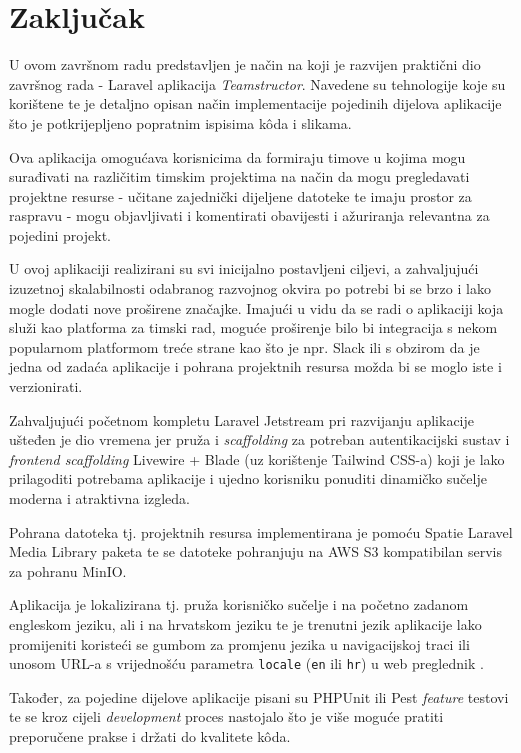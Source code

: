 \section{Zaključak}
U ovom završnom radu predstavljen je način na koji je razvijen praktični dio završnog rada - Laravel aplikacija \textit{Teamstructor}. Navedene su tehnologije koje su korištene te je detaljno opisan način implementacije pojedinih dijelova aplikacije što je potkrijepljeno popratnim ispisima k\^oda i slikama.

Ova aplikacija omogućava korisnicima da formiraju timove u kojima mogu surađivati na različitim timskim projektima na način da mogu pregledavati projektne resurse - učitane zajednički dijeljene datoteke te imaju prostor za raspravu - mogu objavljivati i komentirati obavijesti i ažuriranja relevantna za pojedini projekt. 

U ovoj aplikaciji realizirani su svi inicijalno postavljeni ciljevi, a zahvaljujući izuzetnoj skalabilnosti odabranog razvojnog okvira po potrebi bi se brzo i lako mogle dodati nove proširene značajke. Imajući u vidu da se radi o aplikaciji koja služi kao platforma za timski rad, moguće proširenje bilo bi integracija s nekom popularnom platformom treće strane kao što je npr. Slack ili s obzirom da je jedna od zadaća aplikacije i pohrana projektnih resursa možda bi se moglo iste i verzionirati.  

Zahvaljujući početnom kompletu Laravel Jetstream pri razvijanju aplikacije ušteđen je dio vremena jer pruža i \textit{scaffolding} za potreban autentikacijski sustav i \textit{frontend scaffolding} Livewire + Blade (uz korištenje Tailwind CSS-a) koji je lako prilagoditi potrebama aplikacije i ujedno korisniku ponuditi dinamičko sučelje moderna i atraktivna izgleda. 

Pohrana datoteka tj. projektnih resursa implementirana je pomoću Spatie Laravel Media Library paketa te se datoteke pohranjuju na AWS S3 kompatibilan servis za pohranu MinIO.

Aplikacija je lokalizirana tj. pruža korisničko sučelje i na početno zadanom engleskom jeziku, ali i na hrvatskom jeziku te je trenutni jezik aplikacije lako promijeniti koristeći se gumbom za promjenu jezika u navigacijskoj traci ili unosom URL-a s vrijednošću parametra \texttt{locale} (\texttt{en} ili \texttt{hr}) u web preglednik .

Također, za pojedine dijelove aplikacije pisani su PHPUnit ili Pest \textit{feature} testovi te se kroz cijeli \textit{development} proces nastojalo što je više moguće pratiti preporučene prakse i držati do kvalitete k\^oda.
